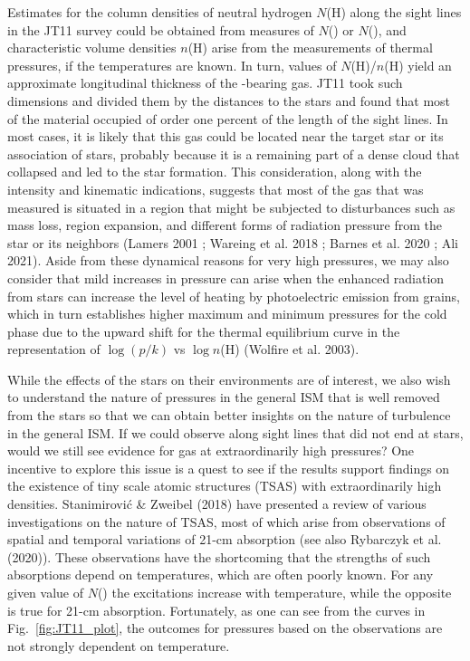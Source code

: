 \documentclass[modern]{aastex63}
\begin{document}
Estimates for the column densities of neutral hydrogen $N$(H) along the sight lines in the JT11 
survey could be obtained from measures of $N$() or $N$(), and 
characteristic volume densities $n$(H) arise from the measurements of thermal pressures, if 
the temperatures are known.  In turn, values of $N$(H)/$n$(H) yield an approximate 
longitudinal thickness of the -bearing gas.  JT11 took such dimensions and divided 
them by the distances to the stars and found that most of the material occupied of order one 
percent of the length of the sight lines.  In most cases, it is likely that this gas could be located 
near the target star or its association of stars, probably because it is a remaining part of a dense 
cloud that collapsed and led to the star formation.  This consideration, along with the intensity 
and kinematic indications, suggests that most of the gas that was measured is situated in a 
region that might be subjected to disturbances such as mass loss,  region expansion, 
and different forms of radiation pressure from the star or its neighbors (Lamers 2001 ; Wareing 
et al. 2018 ; Barnes et al. 2020 ; Ali 2021).  Aside from these dynamical reasons for very high 
pressures, we may also consider that mild increases in pressure can arise when the enhanced 
radiation from stars can increase the level of heating by photoelectric emission from grains, 
which in turn establishes higher maximum and minimum pressures for the cold phase due to 
the upward shift for the thermal equilibrium curve in the representation of $\log (p/k)$ vs $\log 
n$(H) (Wolfire et al. 2003).

While the effects of the stars on their environments are of interest, we also wish to understand 
the nature of pressures in the general ISM that is well removed from the stars so that we can 
obtain better insights on the nature of turbulence in the general ISM.  If we could observe along 
sight lines that did not end at stars, would we still see evidence for gas at extraordinarily high 
pressures?  One incentive to explore this issue is a quest to see if the  results support 
findings on the existence of tiny scale atomic structures (TSAS) with extraordinarily high 
densities.  Stanimirović \& Zweibel (2018) have presented a review of various investigations on 
the nature of TSAS, most of which arise from observations of spatial and temporal variations of 
21-cm absorption (see also Rybarczyk et al. (2020)).  These observations have the shortcoming 
that the strengths of such absorptions depend on temperatures, which are often poorly known.  
For any given value of $N$() the  excitations increase with temperature, 
while the opposite is true for 21-cm absorption.  Fortunately, as one can see from the curves in 
Fig.~\ref{fig:JT11_plot}, the outcomes for pressures based on the  observations are 
not strongly dependent on temperature.
\end{document}
